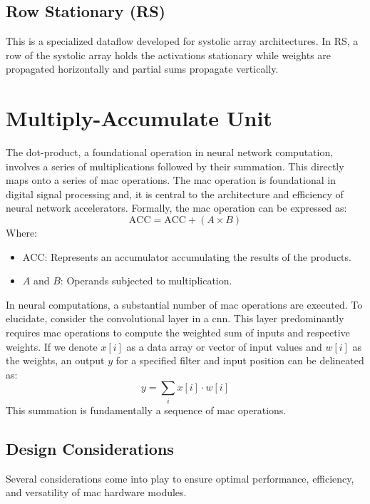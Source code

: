 \subsection*{Row Stationary (RS)}
This is a specialized dataflow developed for systolic array architectures. In RS, a row of the systolic array holds the activations stationary while weights are propagated horizontally and partial sums propagate vertically.


\section{Multiply-Accumulate Unit}

The dot-product, a foundational operation in neural network computation, involves a series of multiplications followed by their summation. This directly maps onto a series of \gls{mac} operations. The \gls{mac} operation is foundational in digital signal processing and, it is central to the architecture and efficiency of neural network accelerators. Formally, the \gls{mac} operation can be expressed as:
\begin{equation}
\text{ACC} = \text{ACC} + (A \times B)
\end{equation}
Where:
\begin{itemize}
	\item \( \text{ACC} \): Represents an accumulator accumulating the results of the products.
	\item \( A \) and \( B \): Operands subjected to multiplication.
\end{itemize}

In neural computations, a substantial number of \gls{mac} operations are executed. To elucidate, consider the convolutional layer in a \gls{cnn}. This layer predominantly requires \gls{mac} operations to compute the weighted sum of inputs and respective weights. If we denote \( x[i] \) as a data array or vector of input values and \( w[i] \) as the weights, an output \( y \) for a specified filter and input position can be delineated as:
\begin{equation}
y = \sum_{i} x[i] \cdot w[i]
\end{equation}
This summation is fundamentally a sequence of \gls{mac} operations.

\subsection{Design Considerations}
Several considerations come into play to ensure optimal performance, efficiency, and versatility of \gls{mac} hardware modules.

